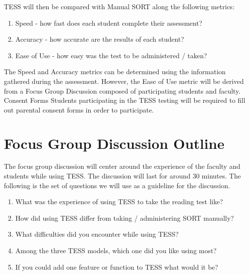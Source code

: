 TESS will then be compared with Manual SORT along the following metrics:
\begin{enumerate}
\item Speed - how fast does each student complete their assessment?
\item Accuracy - how accurate are the results of each student?
\item Ease of Use - how easy was the test to be administered / taken?
\end{enumerate}

The Speed and Accuracy metrics can be determined using the information gathered during the assessment. However, the Ease of Use metric will be derived from a Focus Group Discussion composed of participating students and faculty.
Consent Forms
Students participating in the TESS testing will be required to fill out parental consent forms in order to participate. 

\section{Focus Group Discussion Outline}
The focus group discussion will center around the experience of the faculty and students while using TESS. The discussion will last for around 30 minutes. The following is the set of questions we will use as a guideline for the discussion. 

\begin{enumerate}
\item What was the experience of using TESS to take the reading test like?
\item How did using TESS differ from taking / administering SORT manually?
\item What difficulties did you encounter while using TESS?
\item Among the three TESS models, which one did you like using most?
\item If you could add one feature or function to TESS what would it be?
\end{enumerate}